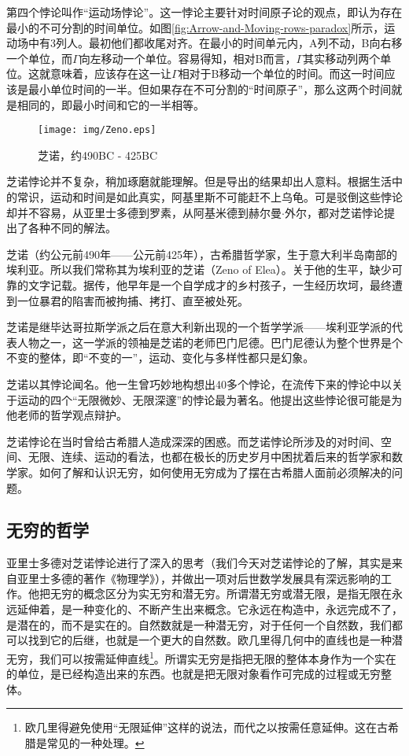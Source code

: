 \documentclass{article}
\begin{document}
第四个悖论叫作“运动场悖论”。这一悖论主要针对时间原子论的观点，即认为存在最小的不可分割的时间单位。如图\ref{fig:Arrow-and-Moving-rows-paradox}所示，运动场中有3列人。最初他们都收尾对齐。在最小的时间单元内，A列不动，B向右移一个单位，而$\Gamma$向左移动一个单位。容易得知，相对B而言，$\Gamma$其实移动列两个单位。这就意味着，应该存在这一让$\Gamma$相对于B移动一个单位的时间。而这一时间应该是最小单位时间的一半。但如果存在不可分割的“时间原子”，那么这两个时间就是相同的，即最小时间和它的一半相等。

\begin{wrapfigure}{L}{0.3\textwidth}
 \centering
 \texttt{[image: img/Zeno.eps]}
 \captionsetup{labelformat=empty}
 \caption{芝诺，约490BC - 425BC}
 \label{fig:Zeno-of-Elea}
\end{wrapfigure}

芝诺悖论并不复杂，稍加琢磨就能理解。但是导出的结果却出人意料。根据生活中的常识，运动和时间是如此真实，阿基里斯不可能赶不上乌龟。可是驳倒这些悖论却并不容易，从亚里士多德到罗素，从阿基米德到赫尔曼$\cdot$外尔，都对芝诺悖论提出了各种不同的解法\cite{Wikipedia-Zeno}。

芝诺（约公元前490年——公元前425年），古希腊哲学家，生于意大利半岛南部的埃利亚。所以我们常称其为埃利亚的芝诺（Zeno of Elea）。关于他的生平，缺少可靠的文字记载。据传，他早年是一个自学成才的乡村孩子，一生经历坎坷，最终遭到一位暴君的陷害而被拘捕、拷打、直至被处死\cite{HanXueTao16}。

芝诺是继毕达哥拉斯学派之后在意大利新出现的一个哲学学派——埃利亚学派的代表人物之一，这一学派的领袖是芝诺的老师巴门尼德。巴门尼德认为整个世界是个不变的整体，即“不变的一”，运动、变化与多样性都只是幻象。

芝诺以其悖论闻名。他一生曾巧妙地构想出40多个悖论，在流传下来的悖论中以关于运动的四个“无限微妙、无限深邃”的悖论最为著名。他提出这些悖论很可能是为他老师的哲学观点辩护。

芝诺悖论在当时曾给古希腊人造成深深的困惑。而芝诺悖论所涉及的对时间、空间、无限、连续、运动的看法，也都在极长的历史岁月中困扰着后来的哲学家和数学家。如何了解和认识无穷，如何使用无穷成为了摆在古希腊人面前必须解决的问题。

\subsection{无穷的哲学}
亚里士多德对芝诺悖论进行了深入的思考（我们今天对芝诺悖论的了解，其实是来自亚里士多德的著作《物理学》），并做出一项对后世数学发展具有深远影响的工作。他把无穷的概念区分为实无穷和潜无穷。所谓潜无穷或潜无限，是指无限在永远延伸着，是一种变化的、不断产生出来概念。它永远在构造中，永远完成不了，是潜在的，而不是实在的。自然数就是一种潜无穷，对于任何一个自然数，我们都可以找到它的后继，也就是一个更大的自然数。欧几里得几何中的直线也是一种潜无穷，我们可以按需延伸直线\footnote{欧几里得避免使用“无限延伸”这样的说法，而代之以按需任意延伸。这在古希腊是常见的一种处理。}。所谓实无穷是指把无限的整体本身作为一个实在的单位，是已经构造出来的东西。也就是把无限对象看作可完成的过程或无穷整体。
\end{document}
